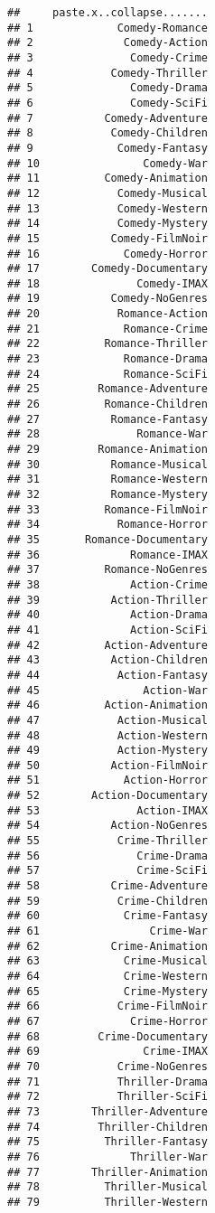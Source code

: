 \documentclass[
]{article}
\begin{document}
\begin{verbatim}
##     paste.x..collapse.......
## 1             Comedy-Romance
## 2              Comedy-Action
## 3               Comedy-Crime
## 4            Comedy-Thriller
## 5               Comedy-Drama
## 6               Comedy-SciFi
## 7           Comedy-Adventure
## 8            Comedy-Children
## 9             Comedy-Fantasy
## 10                Comedy-War
## 11          Comedy-Animation
## 12            Comedy-Musical
## 13            Comedy-Western
## 14            Comedy-Mystery
## 15           Comedy-FilmNoir
## 16             Comedy-Horror
## 17        Comedy-Documentary
## 18               Comedy-IMAX
## 19           Comedy-NoGenres
## 20            Romance-Action
## 21             Romance-Crime
## 22          Romance-Thriller
## 23             Romance-Drama
## 24             Romance-SciFi
## 25         Romance-Adventure
## 26          Romance-Children
## 27           Romance-Fantasy
## 28               Romance-War
## 29         Romance-Animation
## 30           Romance-Musical
## 31           Romance-Western
## 32           Romance-Mystery
## 33          Romance-FilmNoir
## 34            Romance-Horror
## 35       Romance-Documentary
## 36              Romance-IMAX
## 37          Romance-NoGenres
## 38              Action-Crime
## 39           Action-Thriller
## 40              Action-Drama
## 41              Action-SciFi
## 42          Action-Adventure
## 43           Action-Children
## 44            Action-Fantasy
## 45                Action-War
## 46          Action-Animation
## 47            Action-Musical
## 48            Action-Western
## 49            Action-Mystery
## 50           Action-FilmNoir
## 51             Action-Horror
## 52        Action-Documentary
## 53               Action-IMAX
## 54           Action-NoGenres
## 55            Crime-Thriller
## 56               Crime-Drama
## 57               Crime-SciFi
## 58           Crime-Adventure
## 59            Crime-Children
## 60             Crime-Fantasy
## 61                 Crime-War
## 62           Crime-Animation
## 63             Crime-Musical
## 64             Crime-Western
## 65             Crime-Mystery
## 66            Crime-FilmNoir
## 67              Crime-Horror
## 68         Crime-Documentary
## 69                Crime-IMAX
## 70            Crime-NoGenres
## 71            Thriller-Drama
## 72            Thriller-SciFi
## 73        Thriller-Adventure
## 74         Thriller-Children
## 75          Thriller-Fantasy
## 76              Thriller-War
## 77        Thriller-Animation
## 78          Thriller-Musical
## 79          Thriller-Western

\end{verbatim}
\end{document}
